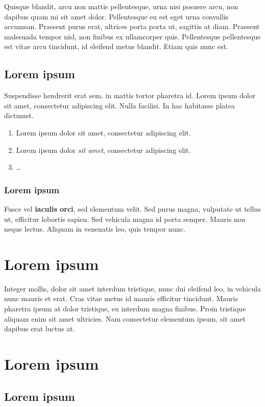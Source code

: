 \begin{pdf}
Quisque blandit, arcu non mattis pellentesque, urna nisi posuere arcu, non dapibus quam mi sit amet dolor. Pellentesque eu est eget urna convallis accumsan. Praesent purus erat, ultrices porta porta ut, sagittis at diam. Praesent malesuada tempor nisl, non finibus ex ullamcorper quis. Pellentesque pellentesque est vitae arcu tincidunt, id eleifend metus blandit. Etiam quis nunc est.

\subsection{Lorem ipsum}

Suspendisse hendrerit erat sem, in mattis tortor pharetra id. Lorem ipsum dolor sit amet, consectetur adipiscing elit. Nulla facilisi. In hac habitasse platea dictumst.
\begin{enumerate}
\item Lorem ipsum dolor sit amet, consectetur adipiscing elit.
\item Lorem ipsum dolor \textit{sit amet}, consectetur adipiscing elit.
\item \ldots
\end{enumerate}

\subsubsection{Lorem ipsum}

Fusce vel \textbf{iaculis orci}, sed elementum velit. Sed purus magna, vulputate ut tellus ut, efficitur lobortis sapien. Sed vehicula magna id porta semper. Mauris non neque lectus. Aliquam in venenatis leo, quis tempor nunc.

\section{Lorem ipsum}

Integer mollis, dolor sit amet interdum tristique, nunc dui eleifend leo, in vehicula nunc mauris et erat. Cras vitae metus id mauris efficitur tincidunt. Mauris pharetra ipsum at dolor tristique, eu interdum magna finibus. Proin tristique aliquam enim sit amet ultricies. Nam consectetur elementum ipsum, sit amet dapibus erat luctus at.

\section{Lorem ipsum}

\subsection{Lorem ipsum}


\end{pdf}
